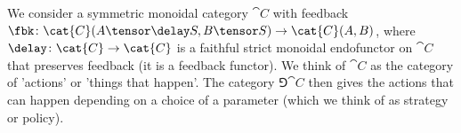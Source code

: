We consider a symmetric monoidal category \(\cat{C}\) with feedback \(\fbk \colon \cat{C}(A \tensor \delay S, B \tensor S) \to \cat{C}(A,B) \), where \(\delay \colon \cat{C} \to \cat{C}\) is a faithful strict monoidal endofunctor on \(\cat{C}\) that preserves feedback (it is a feedback functor).
We think of \(\cat{C}\) as the category of 'actions' or 'things that happen'.
The category \(\Game{\cat{C}}\) then gives the actions that can happen depending on a choice of a parameter (which we think of as strategy or policy).

